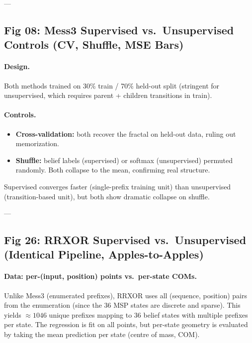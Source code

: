 \documentclass[11pt]{article}
\begin{document}
---

\subsection{Fig 08: Mess3 Supervised vs.\ Unsupervised Controls (CV, Shuffle, MSE Bars)}

\paragraph{Design.}

Both methods trained on 30\% train / 70\% held-out split (stringent for unsupervised, which requires parent + children transitions in train).

\paragraph{Controls.}

\begin{itemize}
\item \textbf{Cross-validation:} both recover the fractal on held-out data, ruling out memorization.
\item \textbf{Shuffle:} belief labels (supervised) or softmax (unsupervised) permuted randomly. Both collapse to the mean, confirming real structure.
\end{itemize}

Supervised converges faster (single-prefix training unit) than unsupervised (transition-based unit), but both show dramatic collapse on shuffle.

---

\subsection{Fig 26: RRXOR Supervised vs.\ Unsupervised (Identical Pipeline, Apples-to-Apples)}

\paragraph{Data: per-(input, position) points vs.\ per-state COMs.}

Unlike Mess3 (enumerated prefixes), RRXOR uses all (sequence, position) pairs from the enumeration (since the 36 MSP states are discrete and sparse). This yields $\approx 1046$ unique prefixes mapping to 36 belief states with multiple prefixes per state. The regression is fit on all points, but per-state geometry is evaluated by taking the mean prediction per state (centre of mass, COM).
\end{document}
